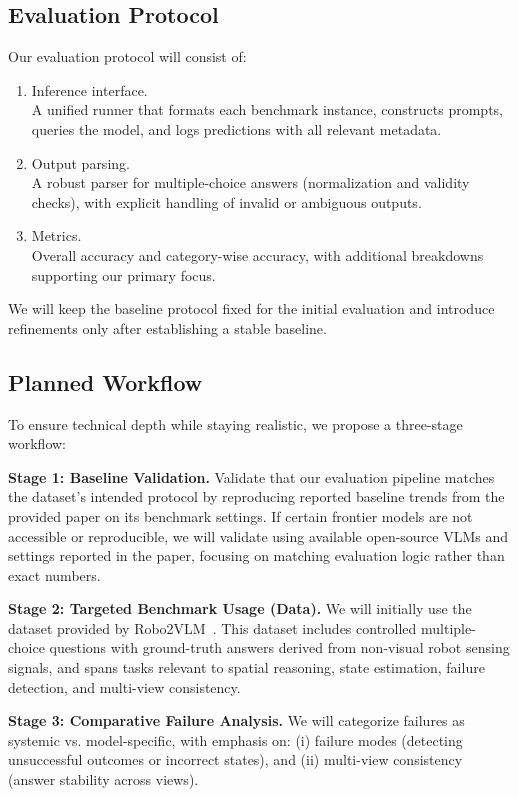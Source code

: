 \documentclass[10pt,twocolumn,letterpaper]{article}
\begin{document}
\subsection{Evaluation Protocol}
Our evaluation protocol will consist of:
\begin{enumerate}
  \item Inference interface.\\
  A unified runner that formats each benchmark instance, constructs prompts, queries the model, and logs predictions with all relevant metadata.

  \item Output parsing.\\
  A robust parser for multiple-choice answers (normalization and validity checks), with explicit handling of invalid or ambiguous outputs.

  \item Metrics.\\
  Overall accuracy and category-wise accuracy, with additional breakdowns supporting our primary focus.
\end{enumerate}
We will keep the baseline protocol fixed for the initial evaluation and introduce refinements only after establishing a stable baseline.


\subsection{Planned Workflow}
To ensure technical depth while staying realistic, we propose a three-stage workflow:

\textbf{Stage 1: Baseline Validation.}
Validate that our evaluation pipeline matches the dataset’s intended protocol by reproducing reported baseline trends from the provided paper on its benchmark settings.
If certain frontier models are not accessible or reproducible, we will validate using available open-source VLMs and settings reported in the paper, focusing on matching evaluation logic rather than exact numbers.

\textbf{Stage 2: Targeted Benchmark Usage (Data).}
We will initially use the dataset provided by Robo2VLM~\cite{chen2025robo2vlm}. This dataset includes controlled multiple-choice questions with ground-truth answers derived from non-visual robot sensing signals, and spans tasks relevant to spatial reasoning, state estimation, failure detection, and multi-view consistency.

\textbf{Stage 3: Comparative Failure Analysis.}
We will categorize failures as systemic vs. model-specific, with emphasis on:
(i) failure modes (detecting unsuccessful outcomes or incorrect states),
and (ii) multi-view consistency (answer stability across views).
\end{document}

